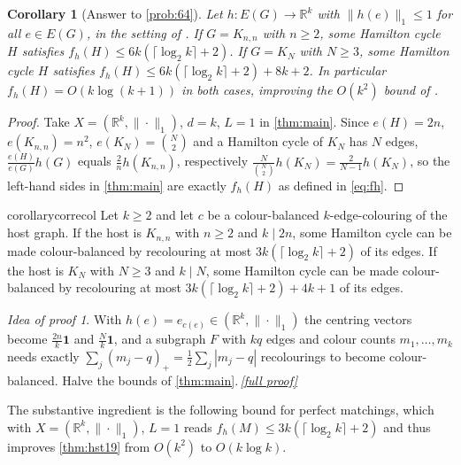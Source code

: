 \documentclass[11pt,a4paper]{article}
\theoremstyle{plain}
\newtheorem{corollary}[theorem]{Corollary}
\theoremstyle{definition}
\theoremstyle{remark}
\newtheorem*{proofidea}{Idea of proof}
\newcommand{\fullproofref}[1]{\,\hyperref[#1]{\textit{[full proof]}}}
\newcommand{\R}{\mathbb R}
\newcommand{\vone}{\mathbf 1}
\begin{document}
\begin{corollary}[Answer to \cref{prob:64}]\label{cor:answer}
Let $h\colon E(G)\to\R^k$ with $\|h(e)\|_1\le1$ for all $e\in E(G)$, in the setting of \cite{HST26}.
If $G=K_{n,n}$ with $n\ge2$, some Hamilton cycle $H$ satisfies $f_h(H)\le 6k(\lceil\log_2k\rceil+2)$.
If $G=K_N$ with $N\ge3$, some Hamilton cycle $H$ satisfies $f_h(H)\le 6k(\lceil\log_2k\rceil+2)+8k+2$.
In particular $f_h(H)=O(k\log(k+1))$ in both cases, improving the $O(k^2)$ bound of \cite[Theorem~1.4 and \S6]{HST26}.
\end{corollary}
\begin{proof}
Take $X=(\R^k,\|\cdot\|_1)$, $d=k$, $L=1$ in \cref{thm:main}. Since $e(H)=2n$, $e(K_{n,n})=n^2$, $e(K_N)=\binom N2$ and a Hamilton cycle of $K_N$ has $N$ edges, $\frac{e(H)}{e(G)}h(G)$ equals $\frac2nh(K_{n,n})$, respectively $\frac{N}{\binom N2}h(K_N)=\frac2{N-1}h(K_N)$, so the left-hand sides in \cref{thm:main} are exactly $f_h(H)$ as defined in \eqref{eq:fh}.
\end{proof}

\begin{restatable}{corollary}{correcol}\label{cor:recol}
Let $k\ge2$ and let $c$ be a colour-balanced $k$-edge-colouring of the host graph.
If the host is $K_{n,n}$ with $n\ge2$ and $k\mid 2n$, some Hamilton cycle can be made colour-balanced by recolouring at most $3k(\lceil\log_2k\rceil+2)$ of its edges.
If the host is $K_N$ with $N\ge3$ and $k\mid N$, some Hamilton cycle can be made colour-balanced by recolouring at most $3k(\lceil\log_2k\rceil+2)+4k+1$ of its edges.
\end{restatable}
\begin{proofidea}
With $h(e)=e_{c(e)}\in(\R^k,\|\cdot\|_1)$ the centring vectors become $\frac{2n}k\vone$ and $\frac Nk\vone$, and a subgraph $F$ with $kq$ edges and colour counts $m_1,\dots,m_k$ needs exactly $\sum_j(m_j-q)_+=\frac12\sum_j|m_j-q|$ recolourings to become colour-balanced. Halve the bounds of \cref{thm:main}.\fullproofref{pf:recol}
\end{proofidea}

The substantive ingredient is the following bound for perfect matchings, which with $X=(\R^k,\|\cdot\|_1)$, $L=1$ reads $f_h(M)\le 3k(\lceil\log_2k\rceil+2)$ and thus improves \cref{thm:hst19} from $O(k^2)$ to $O(k\log k)$.
\end{document}
